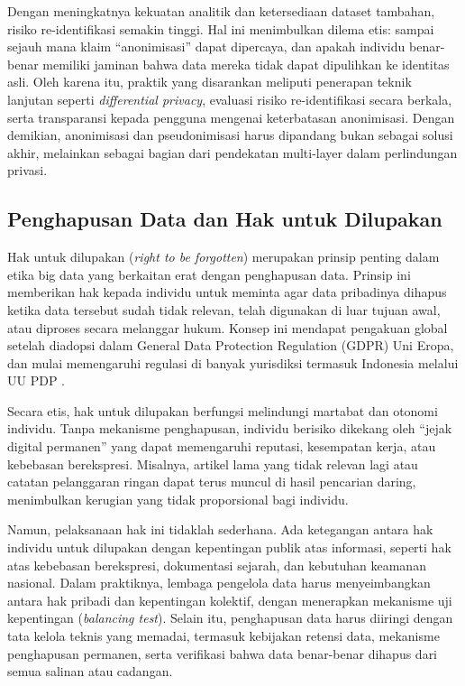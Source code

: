 Dengan meningkatnya kekuatan analitik dan ketersediaan dataset tambahan, risiko re-identifikasi semakin tinggi. Hal ini menimbulkan dilema etis: sampai sejauh mana klaim “anonimisasi” dapat dipercaya, dan apakah individu benar-benar memiliki jaminan bahwa data mereka tidak dapat dipulihkan ke identitas asli. Oleh karena itu, praktik yang disarankan meliputi penerapan teknik lanjutan seperti \textit{differential privacy}, evaluasi risiko re-identifikasi secara berkala, serta transparansi kepada pengguna mengenai keterbatasan anonimisasi. Dengan demikian, anonimisasi dan pseudonimisasi harus dipandang bukan sebagai solusi akhir, melainkan sebagai bagian dari pendekatan multi-layer dalam perlindungan privasi.

\subsection{Penghapusan Data dan Hak untuk Dilupakan}

Hak untuk dilupakan (\textit{right to be forgotten}) merupakan prinsip penting dalam etika big data yang berkaitan erat dengan penghapusan data. Prinsip ini memberikan hak kepada individu untuk meminta agar data pribadinya dihapus ketika data tersebut sudah tidak relevan, telah digunakan di luar tujuan awal, atau diproses secara melanggar hukum. Konsep ini mendapat pengakuan global setelah diadopsi dalam General Data Protection Regulation (GDPR) Uni Eropa, dan mulai memengaruhi regulasi di banyak yurisdiksi termasuk Indonesia melalui UU PDP \cite{voigt2017gdpr, pdp2022}.  

Secara etis, hak untuk dilupakan berfungsi melindungi martabat dan otonomi individu. Tanpa mekanisme penghapusan, individu berisiko dikekang oleh “jejak digital permanen” yang dapat memengaruhi reputasi, kesempatan kerja, atau kebebasan berekspresi. Misalnya, artikel lama yang tidak relevan lagi atau catatan pelanggaran ringan dapat terus muncul di hasil pencarian daring, menimbulkan kerugian yang tidak proporsional bagi individu.  

Namun, pelaksanaan hak ini tidaklah sederhana. Ada ketegangan antara hak individu untuk dilupakan dengan kepentingan publik atas informasi, seperti hak atas kebebasan berekspresi, dokumentasi sejarah, dan kebutuhan keamanan nasional. Dalam praktiknya, lembaga pengelola data harus menyeimbangkan antara hak pribadi dan kepentingan kolektif, dengan menerapkan mekanisme uji kepentingan (\textit{balancing test}). Selain itu, penghapusan data harus diiringi dengan tata kelola teknis yang memadai, termasuk kebijakan retensi data, mekanisme penghapusan permanen, serta verifikasi bahwa data benar-benar dihapus dari semua salinan atau cadangan.  

